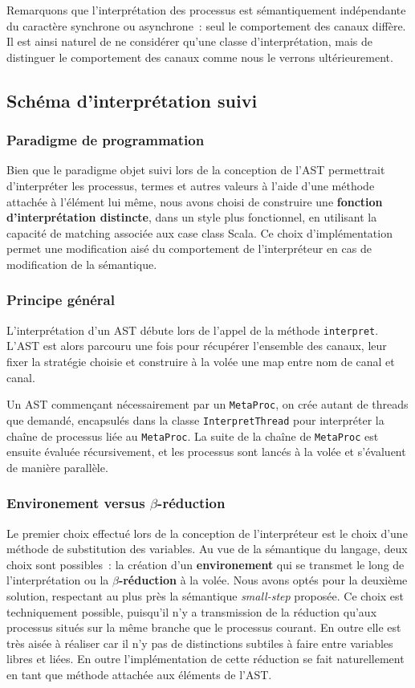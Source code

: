 \documentclass[11pt]{article} %
\begin{document}
Remarquons que l'interprétation des processus est sémantiquement indépendante du caractère synchrone ou asynchrone~: seul le comportement des canaux diffère. Il est ainsi naturel de ne considérer qu'une classe d'interprétation, mais de distinguer le comportement des canaux comme nous le verrons ultérieurement.

\subsection{Schéma d'interprétation suivi}

\subsubsection{Paradigme de programmation}
Bien que le paradigme objet suivi lors de la conception de l'AST permettrait d'interpréter les processus, termes et autres valeurs à l'aide d'une méthode attachée à l'élément lui même, nous avons choisi de construire une \textbf{fonction d'interprétation distincte}, dans un style plus fonctionnel, en utilisant la capacité de matching associée aux case class Scala. Ce choix d'implémentation permet une modification aisé du comportement de l'interpréteur en cas de modification de la sémantique.

\subsubsection{Principe général}
L'interprétation d'un AST débute lors de l'appel de la méthode \texttt{interpret}. L'AST est alors parcouru une fois pour récupérer l'ensemble des canaux, leur fixer la stratégie choisie et construire à la volée une map entre nom de canal et canal.

Un AST commençant nécessairement par un \texttt{MetaProc}, on crée autant de threads que demandé, encapsulés dans la classe \texttt{InterpretThread} pour interpréter la chaîne de processus liée au \texttt{MetaProc}. La suite de la chaîne de \texttt{MetaProc} est ensuite évaluée récursivement, et les processus sont lancés à la volée et s'évaluent de manière parallèle.
\subsubsection{Environement versus $\beta$-réduction}
Le premier choix effectué lors de la conception de l'interpréteur est le choix d'une méthode de substitution des variables. Au vue de la sémantique du langage, deux choix sont possibles~: la création d'un \textbf{environement} qui se transmet le long de l'interprétation ou la  \textbf{$\beta$-réduction} à la volée. Nous avons optés pour la deuxième solution, respectant au plus près la sémantique \emph{small-step} proposée.  Ce choix est techniquement possible, puisqu'il n'y a transmission de la réduction qu'aux processus situés sur la même branche que le processus courant. En outre elle est très aisée à réaliser car il n'y pas de distinctions subtiles à faire entre variables libres et liées. En outre l'implémentation de cette réduction se fait naturellement en tant que méthode attachée aux éléments de l'AST.
\end{document}
